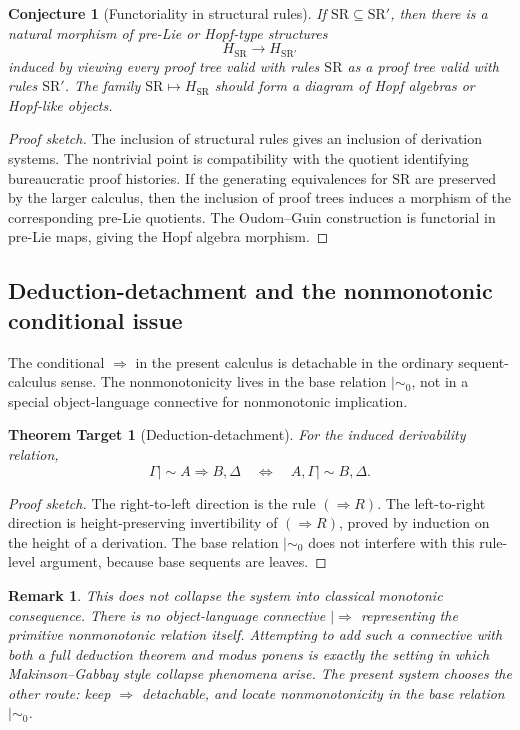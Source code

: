 \documentclass[11pt]{article}
\newtheorem{remark}[theorem]{Remark}
\newtheorem{conjecture}[theorem]{Conjecture}
\newtheorem{target}[theorem]{Theorem Target}
\newcommand{\ms}{\mathrel{\mid\!\sim}}
\newcommand{\mszero}{\mathrel{\mid\!\sim_{0}}}
\begin{document}
\begin{conjecture}[Functoriality in structural rules]
If \(\mathrm{SR}\subseteq \mathrm{SR}'\), then there is a natural morphism of
pre-Lie or Hopf-type structures
\[
H_{\mathrm{SR}}\longrightarrow H_{\mathrm{SR}'}
\]
induced by viewing every proof tree valid with rules \(\mathrm{SR}\) as a
proof tree valid with rules \(\mathrm{SR}'\).  The family
\(\mathrm{SR}\mapsto H_{\mathrm{SR}}\) should form a diagram of Hopf
algebras or Hopf-like objects.
\end{conjecture}

\begin{proof}[Proof sketch]
The inclusion of structural rules gives an inclusion of derivation systems.
The nontrivial point is compatibility with the quotient identifying
bureaucratic proof histories.  If the generating equivalences for
\(\mathrm{SR}\) are preserved by the larger calculus, then the inclusion of
proof trees induces a morphism of the corresponding pre-Lie quotients.  The
Oudom--Guin construction is functorial in pre-Lie maps, giving the Hopf
algebra morphism.
\end{proof}

\subsection{Deduction-detachment and the nonmonotonic conditional issue}

The conditional \(\Rightarrow\) in the present calculus is detachable in the
ordinary sequent-calculus sense.  The nonmonotonicity lives in the base
relation \(\mszero\), not in a special object-language connective for
nonmonotonic implication.

\begin{target}[Deduction-detachment]
For the induced derivability relation,
\[
\Gamma\ms A\Rightarrow B,\Delta
\quad\Longleftrightarrow\quad
A,\Gamma\ms B,\Delta.
\]
\end{target}

\begin{proof}[Proof sketch]
The right-to-left direction is the rule \((\Rightarrow R)\).  The left-to-right
direction is height-preserving invertibility of \((\Rightarrow R)\), proved by
induction on the height of a derivation.  The base relation \(\mszero\) does
not interfere with this rule-level argument, because base sequents are leaves.
\end{proof}

\begin{remark}
This does not collapse the system into classical monotonic consequence.  There
is no object-language connective \(\mid\!\Rightarrow\) representing the
primitive nonmonotonic relation itself.  Attempting to add such a connective
with both a full deduction theorem and modus ponens is exactly the setting in
which Makinson--Gabbay style collapse phenomena arise.  The present system
chooses the other route: keep \(\Rightarrow\) detachable, and locate
nonmonotonicity in the base relation \(\mszero\).
\end{remark}
\end{document}
